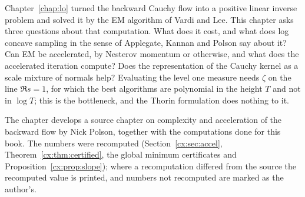 \label{chap:cx}

Chapter~\ref{chap:lo} turned the backward Cauchy flow into a positive linear inverse problem and solved it by the EM algorithm of Vardi and Lee. This chapter asks three questions about that computation. What does it cost, and what does log concave sampling in the sense of Applegate, Kannan and Polson say about it? Can EM be accelerated, by Nesterov momentum or otherwise, and what does the accelerated iteration compute? Does the representation of the Cauchy kernel as a scale mixture of normals help? Evaluating the level one measure needs $\zeta$ on the line $\Re s=1$, for which the best algorithms are polynomial in the height $T$ and not in $\log T$; this is the bottleneck, and the Thorin formulation does nothing to it.

The chapter develops a source chapter on complexity and acceleration of the backward flow by Nick Polson, together with the computations done for this book. The numbers were recomputed (Section~\ref{cx:sec:accel}, Theorem~\ref{cx:thm:certified}, the global minimum certificates and Proposition~\ref{cx:prop:slope}); where a recomputation differed from the source the recomputed value is printed, and numbers not recomputed are marked as the author's.

